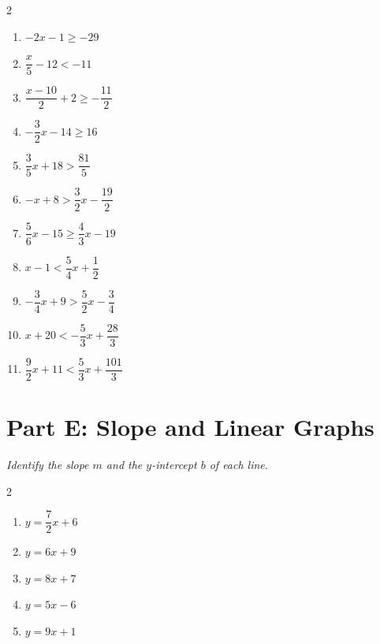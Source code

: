 \documentclass[11pt]{article}
\begin{document}
\begin{multicols}{2}
\begin{enumerate}
  \vspace{1.8cm}
  \item $-2x - 1 \ge -29$
  \vspace{1.8cm}
  \item $\dfrac{x}{5} - 12 < -11$
  \vspace{1.8cm}
  \item $\dfrac{x - 10}{2} + 2 \ge -\dfrac{11}{2}$
  \vspace{1.8cm}
  \item $-\dfrac{3}{2}x - 14 \ge 16$
  \vspace{1.8cm}
  \item $\dfrac{3}{5}x + 18 > \dfrac{81}{5}$
  \vspace{1.8cm}
  \item $-x + 8 > \dfrac{3}{2}x - \dfrac{19}{2}$
  \vspace{1.8cm}
  \item $\dfrac{5}{6}x - 15 \ge \dfrac{4}{3}x - 19$
  \vspace{1.8cm}
  \item $x - 1 < \dfrac{5}{4}x + \dfrac{1}{2}$
  \vspace{1.8cm}
  \item $-\dfrac{3}{4}x + 9 > \dfrac{5}{2}x - \dfrac{3}{4}$
  \vspace{1.8cm}
  \item $x + 20 < -\dfrac{5}{3}x + \dfrac{28}{3}$
  \vspace{1.8cm}
  \item $\dfrac{9}{2}x + 11 < \dfrac{5}{3}x + \dfrac{101}{3}$
  \vspace{1.8cm}
\end{enumerate}
\end{multicols}

\section*{Part E: Slope and Linear Graphs}
\noindent\textit{Identify the slope $m$ and the $y$-intercept $b$ of each line.}
\begin{multicols}{2}
\begin{enumerate}
  \item $y = \dfrac{7}{2}x + 6$
  \vspace{1.2cm}
  \item $y = 6x + 9$
  \vspace{1.2cm}
  \item $y = 8x + 7$
  \vspace{1.2cm}
  \item $y = 5x - 6$
  \vspace{1.2cm}
  \item $y = 9x + 1$
  \vspace{1.2cm}
\end{enumerate}
\end{multicols}
\end{document}
